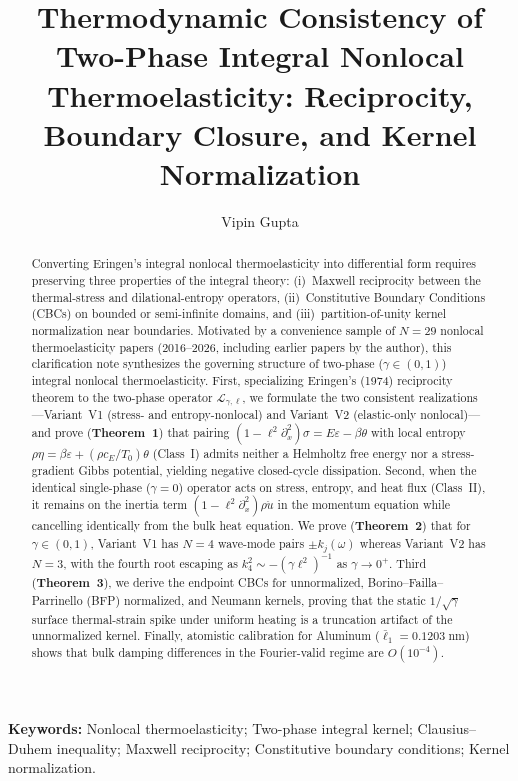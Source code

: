 \documentclass[11pt,a4paper]{article}
\title{\textbf{Thermodynamic Consistency of Two-Phase Integral Nonlocal Thermoelasticity: Reciprocity, Boundary Closure, and Kernel Normalization}}
\author{Vipin Gupta}
\date{}
\theoremstyle{plain}
\theoremstyle{definition}
\theoremstyle{remark}
\newcommand{\Lcal}{\mathcal{L}}
\begin{document}
\maketitle

\begin{abstract}
Converting Eringen's integral nonlocal thermoelasticity into differential form requires preserving three properties of the integral theory: (i)~Maxwell reciprocity between the thermal-stress and dilational-entropy operators, (ii)~Constitutive Boundary Conditions (CBCs) on bounded or semi-infinite domains, and (iii)~partition-of-unity kernel normalization near boundaries. Motivated by a convenience sample of $N=29$ nonlocal thermoelasticity papers (2016--2026, including earlier papers by the author), this clarification note synthesizes the governing structure of two-phase ($\gamma \in (0,1)$) integral nonlocal thermoelasticity. First, specializing Eringen's (1974) reciprocity theorem to the two-phase operator $\Lcal_{\gamma,\ell}$, we formulate the two consistent realizations---Variant~V1 (stress- and entropy-nonlocal) and Variant~V2 (elastic-only nonlocal)---and prove (\textbf{Theorem~1}) that pairing $(1-\ell^2\partial_x^2)\sigma = E\varepsilon - \beta\theta$ with local entropy $\rho\eta = \beta\varepsilon + (\rho c_E/T_0)\theta$ (Class~I) admits neither a Helmholtz free energy nor a stress-gradient Gibbs potential, yielding negative closed-cycle dissipation. Second, when the identical single-phase ($\gamma=0$) operator acts on stress, entropy, and heat flux (Class~II), it remains on the inertia term $(1-\ell^2\partial_x^2)\rho\ddot{u}$ in the momentum equation while cancelling identically from the bulk heat equation. We prove (\textbf{Theorem~2}) that for $\gamma \in (0,1)$, Variant~V1 has $N=4$ wave-mode pairs $\pm k_j(\omega)$ whereas Variant~V2 has $N=3$, with the fourth root escaping as $k_4^2 \sim -(\gamma\ell^2)^{-1}$ as $\gamma \to 0^+$. Third (\textbf{Theorem~3}), we derive the endpoint CBCs for unnormalized, Borino--Failla--Parrinello (BFP) normalized, and Neumann kernels, proving that the static $1/\sqrt{\gamma}$ surface thermal-strain spike under uniform heating is a truncation artifact of the unnormalized kernel. Finally, atomistic calibration for Aluminum ($\bar{\ell}_1 = 0.1203\;\mathrm{nm}$) shows that bulk damping differences in the Fourier-valid regime are $O(10^{-4})$.
\end{abstract}

\noindent\textbf{Keywords:} Nonlocal thermoelasticity; Two-phase integral kernel; Clausius--Duhem inequality; Maxwell reciprocity; Constitutive boundary conditions; Kernel normalization.









\appendix




\end{document}
